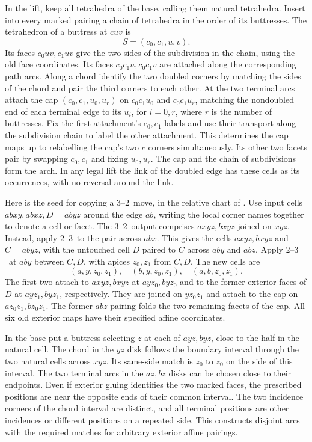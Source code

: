 \documentclass[11pt]{amsart}
\newcommand{\moveup}{\(2\)--\(3\)}
\newcommand{\movedown}{\(3\)--\(2\)}
\begin{document}
In the lift, keep all tetrahedra of the base, calling them natural
tetrahedra. Insert into every marked pairing a chain of tetrahedra in
the order of its buttresses. The tetrahedron of a buttress at \(cuv\) is
\[
                 S=(c_0,c_1,u,v).
\]
Its faces \(c_0uv,c_1uv\) give the two sides of the subdivision in the
chain, using the old face coordinates. Its faces \(c_0c_1u,c_0c_1v\)
are attached along the corresponding path arcs. Along a chord identify
the two doubled corners by matching the sides of the chord and pair the
third corners to each other. At the two terminal arcs attach the cap
\((c_0,c_1,u_0,u_r)\) on \(c_0c_1u_0\) and \(c_0c_1u_r\), matching the
nondoubled end of each terminal edge to its \(u_i\), for \(i=0,r\),
where \(r\) is the number of buttresses. Fix the first
attachment's \(c_0,c_1\) labels and use their transport along the
subdivision chain to label the other attachment. This determines the cap
maps up to relabelling the cap's two \(c\) corners simultaneously. Its
other two facets pair by swapping \(c_0,c_1\) and fixing \(u_0,u_r\).
The cap and the chain of subdivisions form the arch. In any legal lift the
link of the doubled edge has these cells as its occurrences, with no
reversal around the link.

Here is the seed for copying a \movedown\ move, in the relative chart of
\cite[Fig.~16]{bh}. Use input cells \(abxy,abxz,D=abyz\) around the
edge \(ab\), writing the local corner names together to denote a cell
or facet. The \movedown\ output comprises \(axyz,bxyz\) joined on \(xyz\).
Instead, apply \moveup\ to the pair across \(abx\). This gives the cells
\(axyz,bxyz\) and \(C=abyz\), with the untouched cell \(D\) paired to \(C\)
across \(aby\) and \(abz\). Apply \moveup\ at \(aby\) between \(C,D\),
with apices \(z_0,z_1\) from \(C,D\). The new cells are
\[
                (a,y,z_0,z_1),\quad (b,y,z_0,z_1),\quad (a,b,z_0,z_1).
\]
The first two attach to \(axyz,bxyz\) at \(ayz_0,byz_0\) and to the
former exterior faces of \(D\) at \(ayz_1,byz_1\), respectively. They
are joined on \(yz_0z_1\) and attach to the cap on \(az_0z_1,bz_0z_1\).
The former \(abz\) pairing folds the two remaining facets of the cap.
All six old exterior maps have their specified affine coordinates.

In the base put a buttress selecting \(z\) at each of \(ayz,byz\), close
to the half in the natural cell. The chord in the \(yz\) disk follows the
boundary interval through the two natural cells across \(xyz\). Its
same-side match is \(z_0\) to \(z_0\) on the side of this interval. The
two terminal arcs in the \(az,bz\) disks can be chosen close to their
endpoints. Even if exterior gluing identifies the two marked faces, the
prescribed positions are near the opposite ends of their common interval.
The two incidence corners of the chord interval are distinct, and all
terminal positions are other incidences or different positions on a repeated
side. This constructs disjoint arcs with the required matches for arbitrary
exterior affine pairings.
\end{document}
